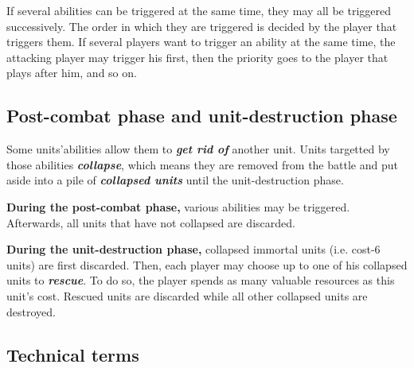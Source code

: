 \documentclass[a4paper]{article}
\begin{document}
    If several abilities can be triggered at the same time,
    they may all be triggered successively.
    The order in which they are triggered is decided by the player that triggers them.
    If several players want to trigger an ability at the same time,
    the attacking player may trigger his first,
    then the priority goes to the player that plays after him, and so on.
    

  \subsection{Post-combat phase and unit-destruction phase}
    
    Some units'abilities allow them to \textbf{\textit{get rid of}} another unit.
    Units targetted by those abilities \textbf{\textit{collapse}},
    which means they are removed from the battle and put aside into a pile
    of \textbf{\textit{collapsed units}} until the unit-destruction phase.
    
    \textbf{During the post-combat phase,} various abilities may be triggered.
    Afterwards, all units that have not collapsed are discarded.
    
    \textbf{During the unit-destruction phase,} collapsed immortal units
    (i.e. cost-6 units) are first discarded.
    Then, each player may choose up to one of his collapsed units to
    \textbf{\textit{rescue}}.
    To do so, the player spends as many valuable resources as this unit's cost.
    Rescued units are discarded while all other collapsed units are destroyed.
    

\newpage
  \subsection{Technical terms}
  
\end{document}
